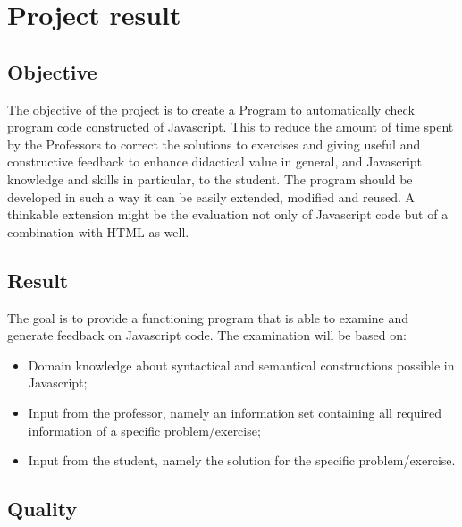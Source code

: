 \documentclass{article}
\begin{document}
\section{Project result}
% 

\subsection{Objective}

The objective of the project is to create a Program to automatically check
program code constructed of Javascript. This to reduce the amount of time spent
by the Professors to correct the solutions to exercises and giving useful and
constructive feedback to enhance didactical value in general, and Javascript
knowledge and skills in particular, to the student. The program should be
developed in such a way it can be easily extended, modified and reused. A
thinkable extension might be the evaluation not only of Javascript code but of
a combination with HTML as well.

\subsection{Result}

The goal is to provide a functioning program that is able to examine and
generate feedback on Javascript code. The examination will be based on:

\begin{itemize}
  \item Domain knowledge about syntactical and semantical constructions
    possible in Javascript;
  \item Input from the professor, namely an information set containing all
    required information of a specific problem/exercise;
  \item Input from the student, namely the solution for the specific
    problem/exercise.
\end{itemize}

\subsection{Quality}
\end{document}
